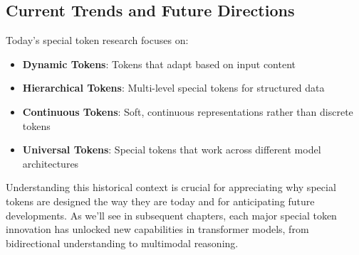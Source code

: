 \subsection{Current Trends and Future Directions}

Today's special token research focuses on:

\begin{itemize}
\item \textbf{Dynamic Tokens}: Tokens that adapt based on input content
\item \textbf{Hierarchical Tokens}: Multi-level special tokens for structured data
\item \textbf{Continuous Tokens}: Soft, continuous representations rather than discrete tokens
\item \textbf{Universal Tokens}: Special tokens that work across different model architectures
\end{itemize}

Understanding this historical context is crucial for appreciating why special tokens are designed the way they are today and for anticipating future developments. As we'll see in subsequent chapters, each major special token innovation has unlocked new capabilities in transformer models, from bidirectional understanding to multimodal reasoning.